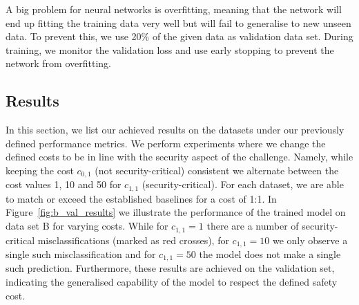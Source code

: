 \documentclass[acmsmall,nonacm]{acmart}
\begin{document}
A big problem for neural networks is overfitting, meaning that the network will end up fitting the training data very well but will fail to generalise to new unseen data. To prevent this, we use 20\% of the given data as validation data set. During training, we monitor the validation loss and use early stopping to prevent the network from overfitting. 

\subsection{Results}
In this section, we list our achieved results on the datasets under our previously defined performance metrics. We perform experiments where we change the defined costs to be in line with the security aspect of the challenge. Namely, while keeping the cost $c_{0, 1}$ (not security-critical) consistent we alternate between the cost values 1, 10 and 50 for $c_{1, 1}$ (security-critical). For each dataset, we are able to match or exceed the established baselines for a cost of 1:1. In Figure~\ref{fig:b_val_results} we illustrate the performance of the trained model on data set B for varying costs. While for $c_{1, 1} = 1$ there are a number of security-critical misclassifications (marked as red crosses), for $c_{1, 1} = 10$ we only observe a single such misclassification and for $c_{1, 1} = 50$ the model does not make a single such prediction. Furthermore, these results are achieved on the validation set, indicating the generalised capability of the model to respect the defined safety cost. 
\end{document}
